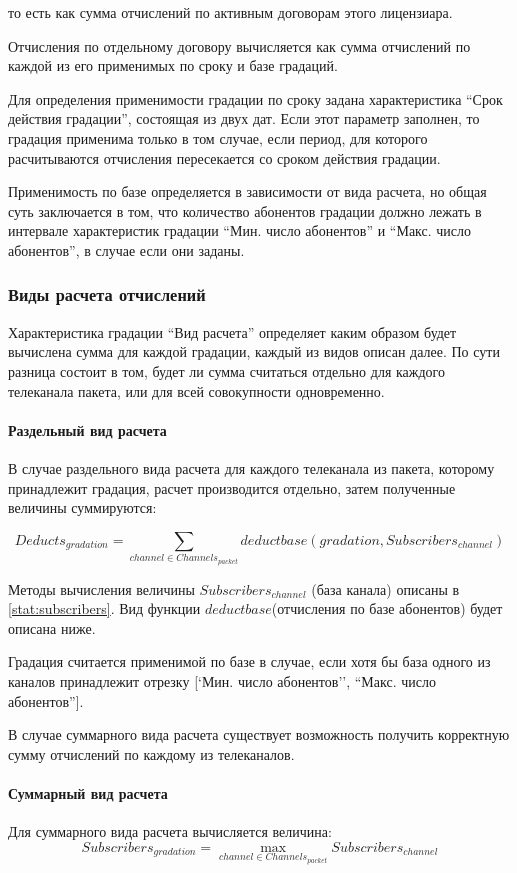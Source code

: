то есть как сумма отчислений по активным договорам этого лицензиара. 

Отчисления по отдельному договору вычисляется как сумма отчислений по каждой из его применимых по сроку и базе градаций.

Для определения применимости градации по сроку задана характеристика ``Срок действия градации'', состоящая из двух дат.
Если этот параметр заполнен, то градация применима только в том случае, если период, 
для которого расчитываются отчисления пересекается со сроком действия градации. 

Применимость по базе определяется в зависимости от вида расчета, но общая суть заключается в том, 
что количество абонентов градации должно лежать в интервале характеристик градации ``Мин. число абонентов'' и
``Макс. число абонентов'', в случае если они заданы.  

\subsubsection{Виды расчета отчислений}
Характеристика градации ``Вид расчета'' определяет каким образом будет вычислена сумма для каждой градации,
каждый из видов описан далее. По сути разница состоит в том, будет ли сумма считаться отдельно
для каждого телеканала пакета, или для всей совокупности одновременно.

\paragraph{Раздельный вид расчета}
В случае раздельного вида расчета для каждого телеканала из пакета, которому принадлежит градация,
расчет производится отдельно, затем полученные величины суммируются:

$$Deducts_{gradation} = \sum_{channel \in Channels_{packet}} deductbase(gradation, Subscribers_{channel})$$

Методы вычисления величины $Subscribers_{channel}$ (база канала) описаны в \ref{stat:subscribers}.
Вид функции $deductbase$(отчисления по базе абонентов) будет описана ниже. 

Градация считается применимой по базе в случае, если хотя бы база одного из каналов принадлежит отрезку 
[`Мин. число абонентов'', ``Макс. число абонентов''].

В случае суммарного вида расчета существует возможность получить корректную сумму отчислений по каждому из 
телеканалов.

\paragraph{Суммарный вид расчета}
Для суммарного вида расчета вычисляется величина:
$$Subscribers_{gradation} = \max\limits_{channel \in Channels_{packet}} Subscribers_{channel}$$

